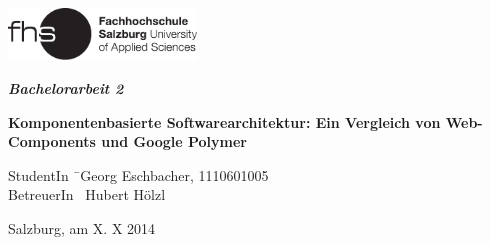 \begin{titlepage}
\begin{center}

\includegraphics[width=5cm]{images/FHSLogo.pdf}

\vspace*{4cm}

\Large{
  \textit{\textbf{Bachelorarbeit 2}}
}

\vspace*{4cm}

\large{
  \textbf{Komponentenbasierte Softwarearchitektur: Ein Vergleich von Web-Components und Google Polymer}\\
}

\end{center}

\vfill

\begin{tabbing}
StudentIn \= \ Georg Eschbacher, 1110601005 \\
BetreuerIn \> \ Hubert Hölzl

\end{tabbing}

Salzburg, am X. X 2014
\end{titlepage}
